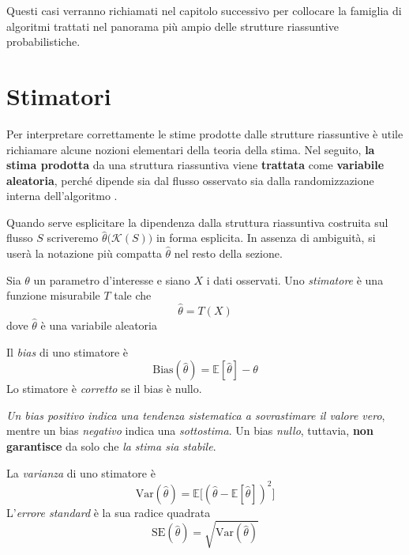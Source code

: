Questi casi verranno richiamati nel capitolo successivo per collocare la famiglia
di algoritmi trattati nel panorama più ampio delle strutture riassuntive probabilistiche.

\section{Stimatori}
\label{sec:stimatori}
Per interpretare correttamente le stime prodotte dalle strutture riassuntive è utile richiamare alcune nozioni elementari
della teoria della stima. Nel seguito, \textbf{la stima prodotta} da una struttura riassuntiva viene \textbf{trattata} come \textbf{variabile aleatoria},
perché dipende sia dal flusso osservato sia dalla randomizzazione interna dell'algoritmo \cite{VanDeGeer_2015}.

Quando serve esplicitare la dipendenza dalla struttura riassuntiva costruita sul flusso $S$
scriveremo $\hat{\theta}\bigl(\mathcal{K}(S)\bigr)$ in forma esplicita.
In assenza di ambiguità, si userà la notazione più compatta $\hat{\theta}$ nel resto della sezione.

\begin{definition}[Stimatore]
Sia $\theta$ un parametro d'interesse e siano $X$ i dati osservati. Uno \emph{stimatore}
è una funzione misurabile $T$ tale che
\[
\hat{\theta} = T(X)
\]
dove $\hat{\theta}$ è una variabile aleatoria
\cite{VanDeGeer_2015}
\end{definition}

\begin{definition}
Il \emph{bias} di uno stimatore è
\[
\mathrm{Bias}(\hat{\theta}) = \mathbb{E}[\hat{\theta}] - \theta
\]
Lo stimatore è \emph{corretto} se il bias è nullo.
\end{definition}

\textit{Un bias positivo indica una tendenza sistematica a sovrastimare il valore vero},
mentre un bias \textit{negativo} indica una \textit{sottostima}. Un bias \textit{nullo}, tuttavia, \textbf{non garantisce} da solo
che \textit{la stima sia stabile}.

\begin{definition}
La \emph{varianza} di uno stimatore è
\[
\mathrm{Var}(\hat{\theta}) =
\mathbb{E}\bigl[(\hat{\theta}-\mathbb{E}[\hat{\theta}])^2\bigr]
\]
L'\emph{errore standard} è la sua radice quadrata
\[
\mathrm{SE}(\hat{\theta}) = \sqrt{\mathrm{Var}(\hat{\theta})}
\]
\end{definition}

